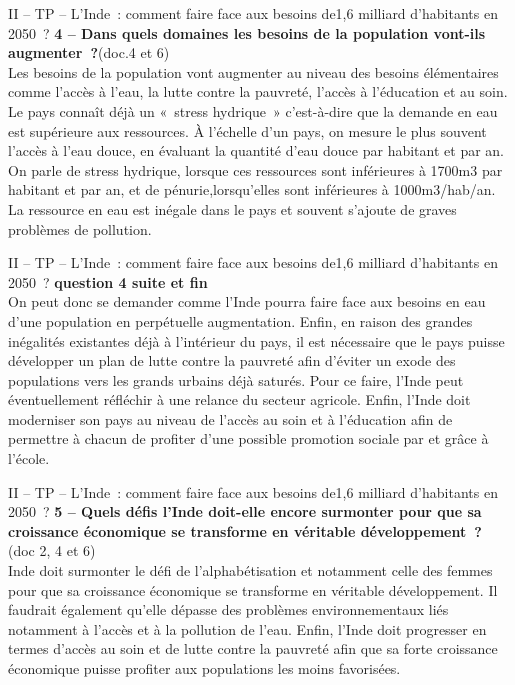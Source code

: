 \documentclass[C]{beamer}
\begin{document}
	\begin{frame}{II -- TP -- L'Inde~: comment faire face aux besoins de1,6 milliard d'habitants en 2050~?}
\textbf{4 -- Dans quels domaines les besoins de la population vont-ils augmenter~?}(doc.4 et 6)\\
\pause
Les besoins de la population vont augmenter au niveau des besoins élémentaires comme l'accès à l'eau, la lutte contre la pauvreté, l'accès à l'éducation et au soin. Le pays conna\^it déjà un «~stress hydrique~» c'est-à-dire que la demande en eau est supérieure aux ressources. \`A l'échelle d'un pays, on mesure le plus souvent l'accès à l'eau douce, en évaluant la quantité d'eau douce par habitant et par an. On parle de stress hydrique, lorsque ces ressources sont inférieures à 1700m3 par habitant et par an, et de pénurie,lorsqu'elles sont inférieures à 1000m3/hab/an. La ressource en eau est inégale dans le pays et souvent s'ajoute de graves problèmes de pollution. 
	\end{frame}
	
	\begin{frame}{II -- TP -- L'Inde~: comment faire face aux besoins de1,6 milliard d'habitants en 2050~?}
\textbf{question 4 suite et fin}
\\
On peut donc se demander comme l'Inde pourra faire face aux besoins en eau d'une population en perpétuelle augmentation. Enfin, en raison des grandes inégalités existantes déjà à l'intérieur du pays, il est nécessaire que le pays puisse développer un plan de lutte contre la pauvreté afin d'éviter un exode des populations vers les grands urbains déjà saturés. Pour ce faire, l'Inde peut éventuellement réfléchir à une relance du secteur agricole.
Enfin, l'Inde doit moderniser son pays au niveau de l'accès au soin et à l'éducation afin de permettre à chacun de profiter d'une possible promotion sociale par et gr\^ace à l'école.
	\end{frame}
	
	\begin{frame}{II -- TP -- L'Inde~: comment faire face aux besoins de1,6 milliard d'habitants en 2050~?}
\textbf{5 -- Quels défis l'Inde doit-elle encore surmonter pour que sa croissance économique se transforme en véritable développement~?} (doc 2, 4 et 6)\\
\pause
Inde doit surmonter le défi de l'alphabétisation et notamment celle des femmes pour que sa croissance économique se transforme en véritable développement. Il faudrait également qu'elle dépasse des problèmes environnementaux liés notamment à l'accès et à la pollution de l'eau. Enfin, l'Inde doit progresser en termes d'accès au soin et de lutte contre la pauvreté afin que sa forte croissance économique puisse profiter aux populations les moins favorisées.
	\end{frame}
	
\end{document}
